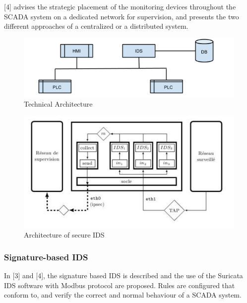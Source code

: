 \documentclass[11pt,]{article}
\begin{document}
{[}4{]} advises the strategic placement of the monitoring devices
throughout the SCADA system on a dedicated network for supervision, and
presents the two different approaches of a centralized or a distributed
system.

\begin{figure}[bottom]

{\centering \includegraphics{thesis_files/figure-latex/unnamed-chunk-35-1} 

}

\caption{Technical Architecture}\label{fig:unnamed-chunk-35}
\end{figure}

\clearpage

\begin{figure}[bottom]

{\centering \includegraphics{thesis_files/figure-latex/unnamed-chunk-36-1} 

}

\caption{Architecture of secure IDS }\label{fig:unnamed-chunk-36}
\end{figure}

\subsubsection{Signature-based IDS}\label{signature-based-ids}

In {[}3{]} and {[}4{]}, the signature based IDS is described and the use
of the Suricata IDS software with Modbus protocol are proposed. Rules
are configured that conform to, and verify the correct and normal
behaviour of a SCADA system.
\end{document}
